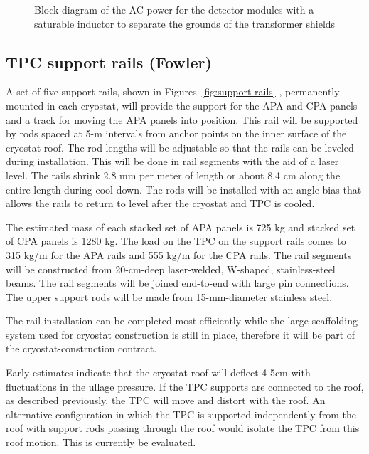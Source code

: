 \begin{figure}[htpb]
\centering
\caption[AC power for the detector modules with a saturable inductor]{Block diagram of the AC power for the detector modules with a saturable inductor to separate the grounds of the transformer shields}
\label{fig:acpwr-det-modules}
\end{figure}

\subsection{TPC support rails (Fowler)}
\label{fd:install:integ:rails}

A set of five support rails, shown in Figures~\ref{fig:support-rails} , permanently mounted in each cryostat, will provide the support for the APA and CPA panels and a track for moving the APA panels into position.  
This rail will be supported by rods spaced at 5-m intervals from anchor points on the inner surface of the cryostat roof.  The rod lengths will be adjustable so that the rails can be leveled during installation.  This will be done in rail segments with the aid of a laser level.  The rails shrink 
2.8 mm per meter of length or about 8.4 cm along the entire length during cool-down.  The rods will be installed with an angle bias that allows the rails to return to level after the cryostat and TPC is cooled.

The estimated mass of each stacked set of APA panels is 725 kg and stacked set of CPA panels is 1280 kg.  The load on the TPC on the support rails comes to 315 kg/m for the APA rails and 555 kg/m 
for the CPA rails.  The rail segments will be constructed from 20-cm-deep laser-welded, W-shaped, stainless-steel beams.  The rail segments will be joined end-to-end with large pin connections.  The 
upper support rods will be made from 15-mm-diameter stainless steel.

The rail installation can be completed most efficiently while the large scaffolding system used for cryostat construction is still in place, therefore it will be part of the cryostat-construction contract.

Early estimates indicate that the cryostat roof will deflect 4-5cm with fluctuations in the ullage pressure.  If the TPC supports are connected to the roof, as described previously, the TPC will move and distort with 
the roof.  An alternative configuration in which the TPC is supported independently from the roof with support rods passing through the roof would isolate the TPC from this roof motion. This is currently be evaluated.

